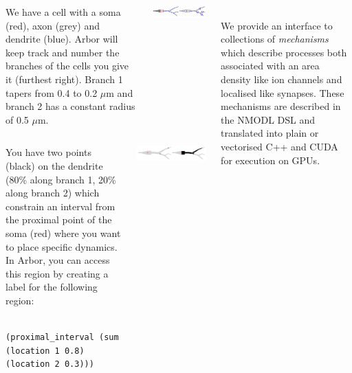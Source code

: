 \documentclass{beamer}
\begin{document}
\begin{frame}[t, fragile]
\begin{columns}[onlytextwidth]
\begin{column}{.49\linewidth}
      \begin{columns}
        \begin{column}{0.44\textwidth}
          We have a cell with a soma (red), axon (grey) and dendrite (blue). Arbor will keep track and number the branches of the cells you give it (furthest right). Branch 1 tapers from 0.4 to 0.2 $\mu$m and branch 2 has a constant radius of 0.5 $\mu$m.
        \end{column}
        \begin{column}{0.55\textwidth}
        \includegraphics[width=\linewidth]{scripts/morph_branches.pdf}
        \end{column}
      \end{columns}
      
      \begin{columns}
        \begin{column}{0.44\textwidth}
          You have two points (black) on the dendrite (80\% along branch 1, 20\% along branch 2) which constrain an interval from the proximal point of the soma (red) where you want to place specific dynamics. In Arbor, you can access this region by creating a label for the following region:
            \begin{verbatim}
            (proximal_interval (sum (location 1 0.8) (location 2 0.3)))
            \end{verbatim}
        \end{column}
        \begin{column}{0.55\textwidth}
        \includegraphics[width=\linewidth]{scripts/points_region.pdf}
        \end{column}
      \end{columns}
    \end{column}
    \begin{column}{.49\linewidth}
      \textbf{}\\
      We provide an interface to collections of \emph{mechanisms} which describe
      processes both associated with an area density like ion channels and
      localised like synapses. These mechanisms are described in the NMODL DSL
      and translated into plain or vectorised C++ and CUDA for execution on GPUs.


\end{column}
\end{columns}
\end{frame}
\end{document}
